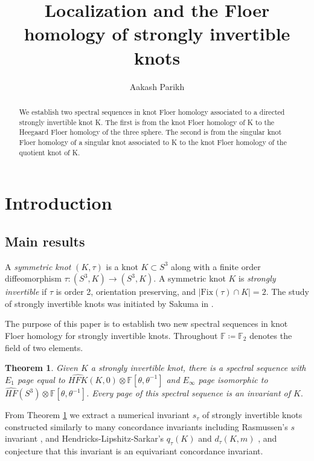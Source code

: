 \documentclass[11pt]{amsart}
\author[A. Parikh]{Aakash Parikh}
\title{Localization and the Floer homology of strongly invertible knots}
\newtheorem{theorem}{Theorem}[section]
\theoremstyle{definition}
\theoremstyle{remark}
\def\F{\mathbb{F}}
\def\HF {\mathit{HF}}
\def\HFK {\mathit{HFK}}
\newcommand\HFKhat{\widehat{\HFK}}
\newcommand\HFhat{\widehat{\HF}}
\numberwithin{equation}{section}
\begin{document}
\begin{abstract}  
We establish two spectral sequences in knot Floer homology associated to a directed strongly invertible knot K. The first is from the knot Floer homology of K to the Heegaard Floer homology of the three sphere. The second is from the singular knot Floer homology of a singular knot associated to K to the knot Floer homology of the quotient knot of K. 
\end{abstract}
\maketitle
\tableofcontents
%
	\section{Introduction}
\subsection{Main results}\label{mainresults}
A \emph{symmetric knot} $(K,\tau)$ is a knot $K\subset S^3$ along with a finite order diffeomorphism $\tau\colon (S^3,K)\to (S^3,K)$. A symmetric knot $K$ is \emph{strongly invertible} if $\tau$ is order 2, orientation preserving, and $|\textrm{Fix}(\tau)\cap K|=2$. The study of strongly invertible knots was initiated by Sakuma in \cite{Sak}. 

The purpose of this paper is to establish two new spectral sequences in knot Floer homology for strongly invertible knots. Throughout $\F\coloneq \F_2$ denotes the field of two elements.

\begin{theorem}\label{Mainthm1}
    Given $K$ a strongly invertible knot, there is a spectral sequence with $E_1$ page equal to $\HFKhat(K,0)\otimes \F[\theta,\theta^{-1}]$ and $E_\infty$ page isomorphic to $\HFhat(S^3)\otimes \F[\theta,\theta^{-1}]$. Every page of this spectral sequence is an invariant of $K.$
\end{theorem}

From Theorem \ref{Mainthm1} we extract a numerical invariant $s_\tau$ of strongly invertible knots constructed similarly to many concordance invariants including Rasmussen's $s$ invariant \cite{rasmussen2004khovanov}, and Hendricks-Lipshitz-Sarkar's $q_\tau(K)$ and $d_\tau(K,m)$ \cite{Hendricks_2016}, and conjecture that this invariant is an equivariant concordance invariant.
\end{document}
